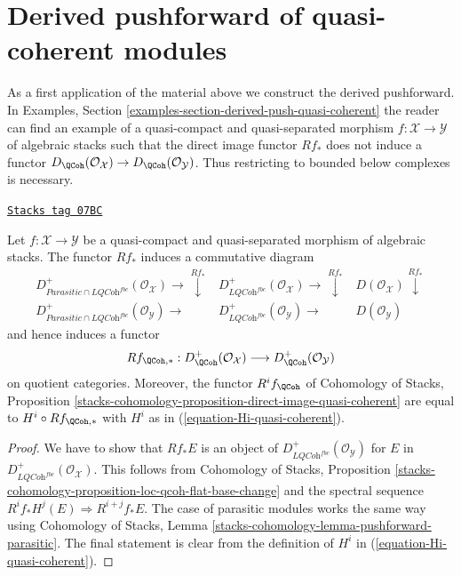 \section{Derived pushforward of quasi-coherent modules}
\label{stacks-perfect-section-derived-pushforward}
As a first application of the material above we construct the derived
pushforward. In
Examples, Section \ref{examples-section-derived-push-quasi-coherent}
the reader can find an example of a quasi-compact and quasi-separated
morphism $f : \mathcal{X} \to \mathcal{Y}$ of algebraic stacks such
that the direct image functor $Rf_*$ does not induce a functor
$D_\QCoh(\mathcal{O}_\mathcal{X}) \to
D_\QCoh(\mathcal{O}_\mathcal{Y})$. Thus restricting to bounded
below complexes is necessary.

\begin{proposition}
\label{stacks-perfect-proposition-derived-direct-image-quasi-coherent}
\href{https://stacks.math.columbia.edu/tag/07BC}{\texttt{Stacks tag 07BC}}

Let $f : \mathcal{X} \to \mathcal{Y}$ be a quasi-compact and
quasi-separated morphism of algebraic stacks.
The functor $Rf_*$ induces a commutative diagram
$$
\begin{array}{ccc}D^{+}_{\textit{Parasitic} \cap \textit{LQCoh}^{fbc}}(\mathcal{O}_\mathcal{X})
\longrightarrow\overset{Rf_*}{\downarrow} & D^{+}_{\textit{LQCoh}^{fbc}}(\mathcal{O}_\mathcal{X})
\longrightarrow\overset{Rf_*}{\downarrow} & D(\mathcal{O}_\mathcal{X})
\overset{Rf_*}{\downarrow} \\ D^{+}_{\textit{Parasitic} \cap \textit{LQCoh}^{fbc}}(\mathcal{O}_\mathcal{Y})
\longrightarrow & D^{+}_{\textit{LQCoh}^{fbc}}(\mathcal{O}_\mathcal{Y}) \longrightarrow & D(\mathcal{O}_\mathcal{Y})\end{array}
$$
and hence induces a functor
$$
Rf_{\QCoh, *} :
D^{+}_\QCoh(\mathcal{O}_\mathcal{X})
\longrightarrow
D^{+}_\QCoh(\mathcal{O}_\mathcal{Y})
$$
on quotient categories. Moreover, the functor $R^if_\QCoh$
of
Cohomology of Stacks,
Proposition \ref{stacks-cohomology-proposition-direct-image-quasi-coherent}
are equal to $H^i \circ Rf_{\QCoh, *}$ with $H^i$ as in
(\ref{equation-Hi-quasi-coherent}).
\end{proposition}

\begin{proof}
We have to show that $Rf_*E$ is an object of
$D^{+}_{\textit{LQCoh}^{fbc}}(\mathcal{O}_\mathcal{Y})$ for
$E$ in $D^{+}_{\textit{LQCoh}^{fbc}}(\mathcal{O}_\mathcal{X})$.
This follows from
Cohomology of Stacks,
Proposition \ref{stacks-cohomology-proposition-loc-qcoh-flat-base-change}
and the spectral sequence $R^if_*H^j(E) \Rightarrow R^{i + j}f_*E$.
The case of parasitic modules works the same way using
Cohomology of Stacks, Lemma
\ref{stacks-cohomology-lemma-pushforward-parasitic}.
The final statement is clear from the definition of
$H^i$ in (\ref{equation-Hi-quasi-coherent}).
\end{proof}

